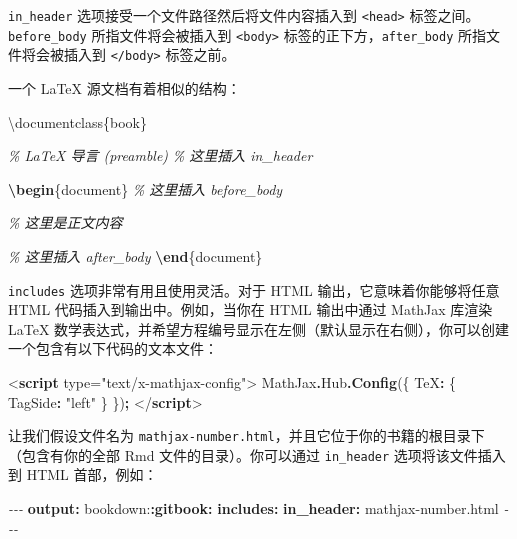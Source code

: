 \documentclass[
  12pt,
]{krantz}
\newenvironment{Shaded}{\begin{snugshade}}{\end{snugshade}}
\newcommand{\AttributeTok}[1]{\textcolor[rgb]{0.13,0.29,0.53}{#1}}
\newcommand{\BuiltInTok}[1]{#1}
\newcommand{\CommentTok}[1]{\textcolor[rgb]{0.56,0.35,0.01}{\textit{#1}}}
\newcommand{\DataTypeTok}[1]{\textcolor[rgb]{0.13,0.29,0.53}{#1}}
\newcommand{\ExtensionTok}[1]{#1}
\newcommand{\FunctionTok}[1]{\textcolor[rgb]{0.13,0.29,0.53}{\textbf{#1}}}
\newcommand{\KeywordTok}[1]{\textcolor[rgb]{0.13,0.29,0.53}{\textbf{#1}}}
\newcommand{\NormalTok}[1]{#1}
\newcommand{\OperatorTok}[1]{\textcolor[rgb]{0.81,0.36,0.00}{\textbf{#1}}}
\newcommand{\OtherTok}[1]{\textcolor[rgb]{0.56,0.35,0.01}{#1}}
\newcommand{\PreprocessorTok}[1]{\textcolor[rgb]{0.56,0.35,0.01}{\textit{#1}}}
\newcommand{\StringTok}[1]{\textcolor[rgb]{0.31,0.60,0.02}{#1}}
\theoremstyle{definition}
\theoremstyle{definition}
\theoremstyle{definition}
\theoremstyle{definition}
\theoremstyle{remark}
\begin{document}
\texttt{in\_header} 选项接受一个文件路径然后将文件内容插入到 \texttt{\textless{}head\textgreater{}} 标签之间。\texttt{before\_body} 所指文件将会被插入到 \texttt{\textless{}body\textgreater{}} 标签的正下方，\texttt{after\_body} 所指文件将会被插入到 \texttt{\textless{}/body\textgreater{}} 标签之前。

一个 LaTeX 源文档有着相似的结构：

\begin{Shaded}
\begin{Highlighting}[]
\BuiltInTok{\textbackslash{}documentclass}\NormalTok{\{}\ExtensionTok{book}\NormalTok{\}}

\CommentTok{\% LaTeX 导言 (preamble)}
\CommentTok{\% 这里插入 in\_header}

\KeywordTok{\textbackslash{}begin}\NormalTok{\{}\ExtensionTok{document}\NormalTok{\}}
\CommentTok{\% 这里插入 before\_body}

\CommentTok{\% 这里是正文内容}

\CommentTok{\% 这里插入 after\_body}
\KeywordTok{\textbackslash{}end}\NormalTok{\{}\ExtensionTok{document}\NormalTok{\}}
\end{Highlighting}
\end{Shaded}

\texttt{includes} 选项非常有用且使用灵活。对于 HTML 输出，它意味着你能够将任意 HTML 代码插入到输出中。例如，当你在 HTML 输出中通过 MathJax 库渲染 LaTeX 数学表达式，并希望方程编号显示在左侧（默认显示在右侧），你可以创建一个包含有以下代码的文本文件：

\begin{Shaded}
\begin{Highlighting}[]
\DataTypeTok{\textless{}}\KeywordTok{script}\OtherTok{ type=}\StringTok{"text/x{-}mathjax{-}config"}\DataTypeTok{\textgreater{}}
\NormalTok{MathJax}\OperatorTok{.}\AttributeTok{Hub}\OperatorTok{.}\FunctionTok{Config}\NormalTok{(\{}
  \DataTypeTok{TeX}\OperatorTok{:}\NormalTok{ \{ }\DataTypeTok{TagSide}\OperatorTok{:} \StringTok{"left"}\NormalTok{ \}}
\NormalTok{\})}\OperatorTok{;}
\DataTypeTok{\textless{}/}\KeywordTok{script}\DataTypeTok{\textgreater{}}
\end{Highlighting}
\end{Shaded}

让我们假设文件名为 \texttt{mathjax-number.html}，并且它位于你的书籍的根目录下（包含有你的全部 Rmd 文件的目录）。你可以通过 \texttt{in\_header} 选项将该文件插入到 HTML 首部，例如：

\begin{Shaded}
\begin{Highlighting}[]
\PreprocessorTok{{-}{-}{-}}
\FunctionTok{output}\KeywordTok{:}
\AttributeTok{  bookdown:}\FunctionTok{:gitbook}\KeywordTok{:}
\AttributeTok{    }\FunctionTok{includes}\KeywordTok{:}
\AttributeTok{      }\FunctionTok{in\_header}\KeywordTok{:}\AttributeTok{ mathjax{-}number.html}
\PreprocessorTok{{-}{-}{-}}
\end{Highlighting}
\end{Shaded}
\end{document}
